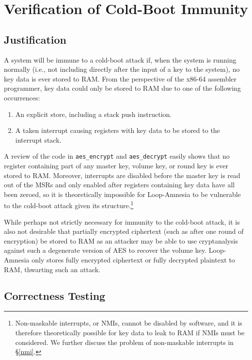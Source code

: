 \documentclass[letterpaper,twocolumn,nonatbib,10pt]{article}
\begin{document}
\section{Verification of Cold-Boot Immunity}

\subsection{Justification}

A system will be immune to a cold-boot attack if, when the system is
running normally (i.e., not including directly after the input of a
key to the system), no key data is ever stored to RAM.  From the
perspective of the x86-64 assembler programmer, key data could
only be stored to RAM due to one of the following occurrences:
\begin{enumerate}
\item An explicit store, including a stack push instruction.
\item A taken interrupt causing registers with key data to be stored
  to the interrupt stack.
\end{enumerate}

A review of the code in \texttt{aes\_encrypt} and
\texttt{aes\_decrypt} easily shows that no register containing part of
any master key, volume key, or round key is ever stored to RAM.
Moreover, interrupts are disabled before the master key is read out of
the MSRs and only enabled after registers containing key data have all
been zeroed, so it is theoretically impossible for Loop-Amnesia to be
vulnerable to the cold-boot attack given its
structure.\footnote{Non-maskable interrupts, or NMIs, cannot be
  disabled by software, and it is therefore theoretically possible for
  key data to leak to RAM if NMIs must be considered.  We further
  discuss the problem of non-maskable interrupts in \S\ref{nmi}.}

While perhaps not strictly necessary for immunity to the cold-boot
attack, it is also not desirable that partially encrypted ciphertext
(such as after one round of encryption) be stored to RAM as an
attacker may be able to use cryptanalysis against such a degenerate
version of AES to recover the volume key.  Loop-Amnesia only stores
fully encrypted ciphertext or fully decrypted plaintext to RAM,
thwarting such an attack.

\subsection{Correctness Testing}
\end{document}
